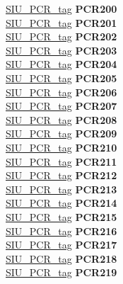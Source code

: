 \begin{DoxyCompactItemize}
\begin{tabbing}
\>\>\mbox{\hyperlink{unionSIU__tag_1_1SIU__PCR__tag}{SIU\_PCR\_tag}} {\bfseries PCR200}\\
\>\>\mbox{\hyperlink{unionSIU__tag_1_1SIU__PCR__tag}{SIU\_PCR\_tag}} {\bfseries PCR201}\\
\>\>\mbox{\hyperlink{unionSIU__tag_1_1SIU__PCR__tag}{SIU\_PCR\_tag}} {\bfseries PCR202}\\
\>\>\mbox{\hyperlink{unionSIU__tag_1_1SIU__PCR__tag}{SIU\_PCR\_tag}} {\bfseries PCR203}\\
\>\>\mbox{\hyperlink{unionSIU__tag_1_1SIU__PCR__tag}{SIU\_PCR\_tag}} {\bfseries PCR204}\\
\>\>\mbox{\hyperlink{unionSIU__tag_1_1SIU__PCR__tag}{SIU\_PCR\_tag}} {\bfseries PCR205}\\
\>\>\mbox{\hyperlink{unionSIU__tag_1_1SIU__PCR__tag}{SIU\_PCR\_tag}} {\bfseries PCR206}\\
\>\>\mbox{\hyperlink{unionSIU__tag_1_1SIU__PCR__tag}{SIU\_PCR\_tag}} {\bfseries PCR207}\\
\>\>\mbox{\hyperlink{unionSIU__tag_1_1SIU__PCR__tag}{SIU\_PCR\_tag}} {\bfseries PCR208}\\
\>\>\mbox{\hyperlink{unionSIU__tag_1_1SIU__PCR__tag}{SIU\_PCR\_tag}} {\bfseries PCR209}\\
\>\>\mbox{\hyperlink{unionSIU__tag_1_1SIU__PCR__tag}{SIU\_PCR\_tag}} {\bfseries PCR210}\\
\>\>\mbox{\hyperlink{unionSIU__tag_1_1SIU__PCR__tag}{SIU\_PCR\_tag}} {\bfseries PCR211}\\
\>\>\mbox{\hyperlink{unionSIU__tag_1_1SIU__PCR__tag}{SIU\_PCR\_tag}} {\bfseries PCR212}\\
\>\>\mbox{\hyperlink{unionSIU__tag_1_1SIU__PCR__tag}{SIU\_PCR\_tag}} {\bfseries PCR213}\\
\>\>\mbox{\hyperlink{unionSIU__tag_1_1SIU__PCR__tag}{SIU\_PCR\_tag}} {\bfseries PCR214}\\
\>\>\mbox{\hyperlink{unionSIU__tag_1_1SIU__PCR__tag}{SIU\_PCR\_tag}} {\bfseries PCR215}\\
\>\>\mbox{\hyperlink{unionSIU__tag_1_1SIU__PCR__tag}{SIU\_PCR\_tag}} {\bfseries PCR216}\\
\>\>\mbox{\hyperlink{unionSIU__tag_1_1SIU__PCR__tag}{SIU\_PCR\_tag}} {\bfseries PCR217}\\
\>\>\mbox{\hyperlink{unionSIU__tag_1_1SIU__PCR__tag}{SIU\_PCR\_tag}} {\bfseries PCR218}\\
\>\>\mbox{\hyperlink{unionSIU__tag_1_1SIU__PCR__tag}{SIU\_PCR\_tag}} {\bfseries PCR219}\\

\end{tabbing}
\end{DoxyCompactItemize}
